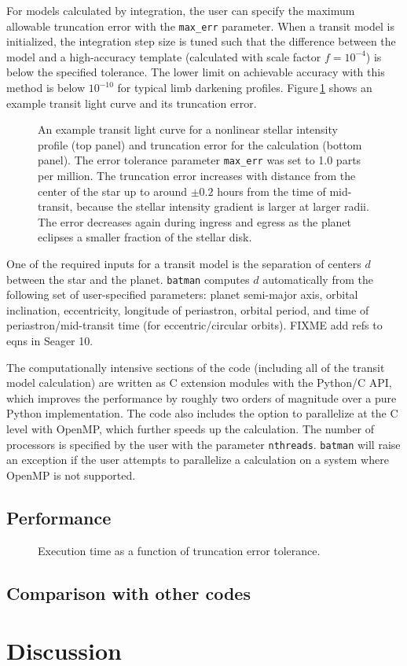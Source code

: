 \documentclass[12pt,preprint]{aastex}
\begin{document}
For models calculated by integration, the user can specify the maximum allowable truncation error with the \texttt{max\_err} parameter.  When a transit model is initialized, the integration step size is tuned such that the difference between the model and a high-accuracy template (calculated with scale factor $f = 10^{-4}$) is below the specified tolerance.  The lower limit on achievable accuracy with this method is below $10^{-10}$ for typical limb darkening profiles. Figure\,\ref{fig:transit} shows an example transit light curve and its truncation error.

\begin{figure}
\caption{An example transit light curve for a nonlinear stellar intensity profile (top panel) and truncation error for the calculation (bottom panel).  The error tolerance parameter \texttt{max\_err} was set to 1.0 parts per million.  The truncation error increases with distance from the center of the star up to around $\pm0.2$ hours from the time of mid-transit, because the stellar intensity gradient is larger at larger radii. The error decreases again during ingress and egress as the planet eclipses a smaller fraction of the stellar disk.}
\label{fig:transit}
\end{figure}

One of the required inputs for a transit model is the separation of centers $d$ between the star and the planet.  \texttt{batman} computes $d$ automatically from the following set of user-specified parameters: planet semi-major axis, orbital inclination, eccentricity, longitude of periastron, orbital period, and time of periastron/mid-transit time (for eccentric/circular orbits). FIXME add refs to eqns in Seager 10. 

The computationally intensive sections of the code (including all of the transit model calculation) are written as C extension modules with the Python/C API, which improves the performance by roughly two orders of magnitude over a pure Python implementation.  The code also includes the option to parallelize at the C level with OpenMP, which further speeds up the calculation. The number of processors is specified by the user with the parameter \texttt{nthreads}.  \texttt{batman} will raise an exception if the user attempts to parallelize a calculation on a system where OpenMP is not supported.


\subsection{Performance}
\begin{figure}
\caption{Execution time as a function of truncation error tolerance.}
\label{fig:timing}
\end{figure}

\subsection{Comparison with other codes}

\section{Discussion}

\acknowledgments



\end{document}
